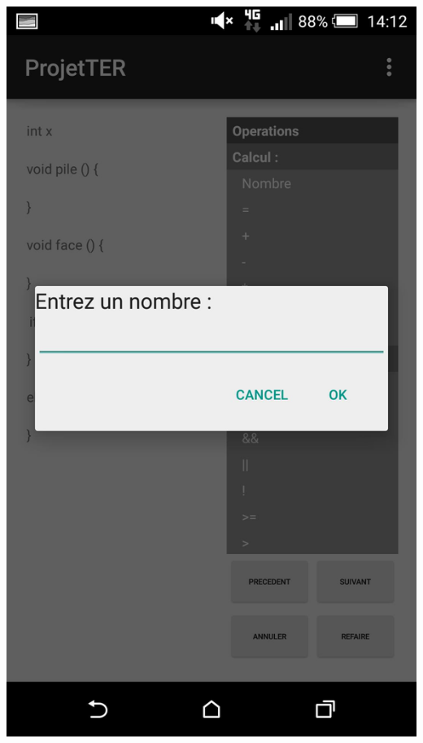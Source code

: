 \documentclass[a4paper]{article}
\begin{document}
\begin{center}
\includegraphics[scale=0.1]{img/popup_nombre.jpg}

\end{center}
\end{document}
